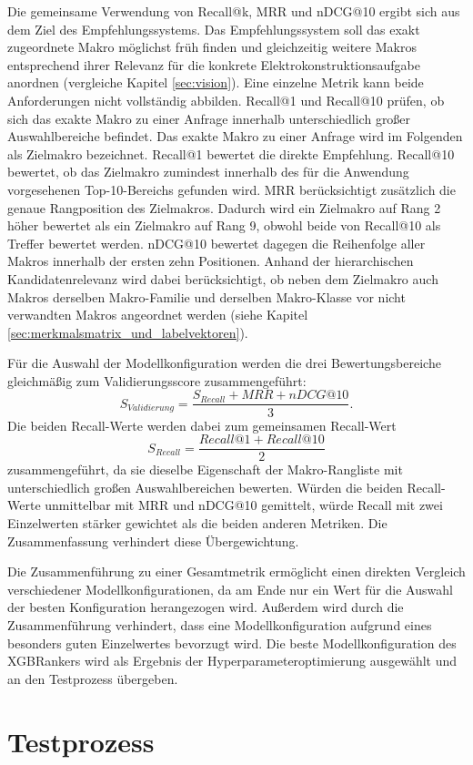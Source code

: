 Die gemeinsame Verwendung von Recall@k, MRR und nDCG@10 ergibt sich aus dem Ziel des Empfehlungssystems. 
Das Empfehlungssystem soll das exakt zugeordnete Makro möglichst früh finden und gleichzeitig weitere Makros entsprechend ihrer Relevanz für die konkrete Elektrokonstruktionsaufgabe anordnen (vergleiche Kapitel \ref{sec:vision}). 
Eine einzelne Metrik kann beide Anforderungen nicht vollständig abbilden. Recall@1 und Recall@10 prüfen, ob sich das exakte Makro zu einer Anfrage innerhalb unterschiedlich großer Auswahlbereiche befindet. 
Das exakte Makro zu einer Anfrage wird im Folgenden als Zielmakro bezeichnet.
Recall@1 bewertet die direkte Empfehlung. Recall@10 bewertet, ob das Zielmakro zumindest innerhalb des für die Anwendung vorgesehenen Top-10-Bereichs gefunden wird.
MRR berücksichtigt zusätzlich die genaue Rangposition des Zielmakros. Dadurch wird ein Zielmakro auf Rang 2 höher bewertet als ein Zielmakro auf Rang 9, obwohl beide von Recall@10 als Treffer bewertet werden. 
nDCG@10 bewertet dagegen die Reihenfolge aller Makros innerhalb der ersten zehn Positionen. Anhand der hierarchischen Kandidatenrelevanz wird dabei berücksichtigt, 
ob neben dem Zielmakro auch Makros derselben Makro-Familie und derselben Makro-Klasse vor nicht verwandten Makros angeordnet werden (siehe Kapitel \ref{sec:merkmalsmatrix_und_labelvektoren}).

Für die Auswahl der Modellkonfiguration werden die drei Bewertungsbereiche gleichmäßig zum Validierungsscore zusammengeführt: \[ S_{Validierung} = \frac{ S_{Recall}+MRR+nDCG@10 }{3}. \]
Die beiden Recall-Werte werden dabei zum gemeinsamen Recall-Wert \[ S_{Recall} = \frac{ Recall@1+Recall@10 }{2} \] zusammengeführt, da sie dieselbe Eigenschaft der Makro-Rangliste mit unterschiedlich großen Auswahlbereichen bewerten. 
Würden die beiden Recall-Werte unmittelbar mit MRR und nDCG@10 gemittelt, würde Recall mit zwei Einzelwerten stärker gewichtet als die beiden anderen Metriken. Die Zusammenfassung verhindert diese Übergewichtung.

Die Zusammenführung zu einer Gesamtmetrik ermöglicht einen direkten Vergleich verschiedener Modellkonfigurationen, da am Ende nur ein Wert für die Auswahl der besten Konfiguration herangezogen wird. 
Außerdem wird durch die Zusammenführung verhindert, dass eine Modellkonfiguration aufgrund eines besonders guten Einzelwertes bevorzugt wird. 
Die beste Modellkonfiguration des XGBRankers wird als Ergebnis der Hyperparameteroptimierung ausgewählt und an den Testprozess übergeben.


\section{Testprozess} 
\label{sec:testprozess} 

